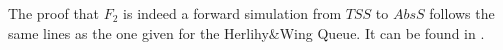 
The proof that $F_2$ is indeed a forward simulation from $\mathit{TSS}$ to $AbsS$ follows the same lines as the one given for the Herlihy\&Wing Queue. It can be found in \cite{extended}.

